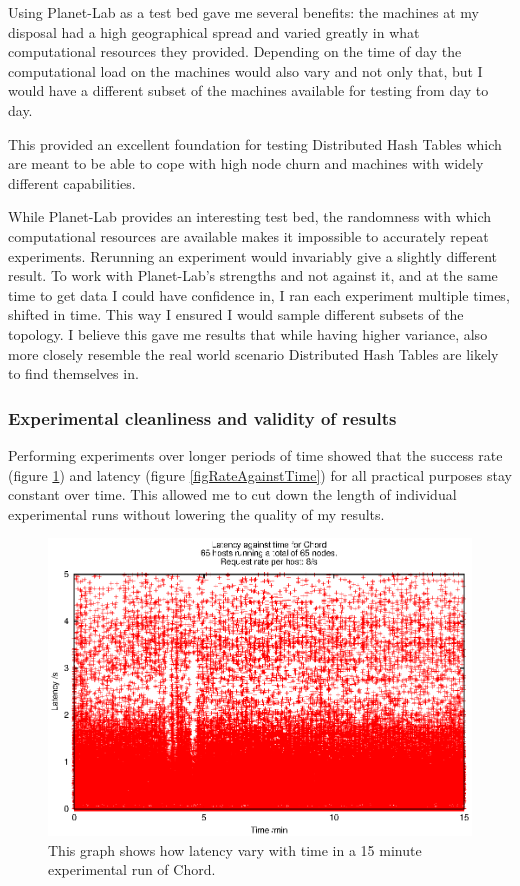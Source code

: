 Using Planet-Lab as a test bed gave me several benefits: the machines at my disposal had a high geographical spread and varied greatly in what computational resources they provided. Depending on the time of day the computational load on the machines would also vary and not only that, but I would have a different subset of the machines available for testing from day to day.

This provided an excellent foundation for testing Distributed Hash Tables which are meant to be able to cope with high node churn and machines with widely different capabilities.

While Planet-Lab provides an interesting test bed, the randomness with which computational resources are available makes it impossible to accurately repeat experiments. Rerunning an experiment would invariably give a slightly different result.
To work with Planet-Lab's strengths and not against it, and at the same time to get data I could have confidence in, I ran each experiment multiple times, shifted in time. This way I ensured I would sample different subsets of the topology. I believe this gave me results that while having higher variance, also more closely resemble the real world scenario Distributed Hash Tables are likely to find themselves in.

\subsubsection{Experimental cleanliness and validity of results}
Performing experiments over longer periods of time showed that the success rate (figure \ref{figLatencyAgainstTime}) and latency (figure \ref{figRateAgainstTime}) for all practical purposes stay constant over time. This allowed me to cut down the length of individual experimental runs without lowering the quality of my results.

\begin{figure}[!h]
  \begin{center}
    \includegraphics[width=0.9\linewidth]{illustrations/latency_aginst_time_chord.eps}
    \caption{This graph shows how latency vary with time in a 15 minute experimental run of Chord.}
    \label{figLatencyAgainstTime}
  \end{center}
\end{figure}

